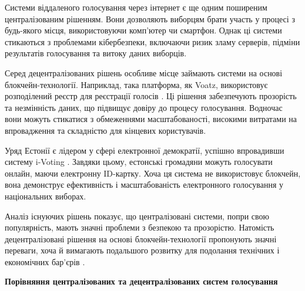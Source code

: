\documentclass[14pt]{extreport}
\begin{document}
  Системи віддаленого голосування через інтернет є ще одним поширеним централізованим рішенням. Вони дозволяють виборцям брати участь у процесі з будь-якого місця, використовуючи комп’ютер чи смартфон. Однак ці системи стикаються з проблемами кібербезпеки, включаючи ризик зламу серверів, підміни результатів голосування та витоку даних виборців.

  Серед децентралізованих рішень особливе місце займають системи на основі блокчейн-технології. Наприклад, така платформа, як Voatz, використовує розподілений реєстр для реєстрації голосів \cite{voatz}. Ці рішення забезпечують прозорість та незмінність даних, що підвищує довіру до процесу голосування. Водночас вони можуть стикатися з обмеженнями масштабованості, високими витратами на впровадження та складністю для кінцевих користувачів.

  Уряд Естонії є лідером у сфері електронної демократії, успішно впровадивши систему i-Voting \cite{ivoting}. Завдяки цьому, естонські громадяни можуть голосувати онлайн, маючи електронну ID-картку. Хоча ця система не використовує блокчейн, вона демонструє ефективність і масштабованість електронного голосування у національних виборах.

  Аналіз існуючих рішень показує, що централізовані системи, попри свою популярність, мають значні проблеми з безпекою та прозорістю. Натомість децентралізовані рішення на основі блокчейн-технології пропонують значні переваги, хоча й вимагають подальшого розвитку для подолання технічних і економічних бар'єрів \cite{ieee:almeida}.
  
  \begin{table}[H]
  \centering
  \renewcommand{\tablename}{Таблиця}
  \renewcommand{\thetable}{\thechapter.\arabic{table}.}
  \captionsetup{justification=raggedleft, singlelinecheck=false, labelsep=period}
  \caption{}
  \textbf{Порівняння централізованих та децентралізованих систем голосування\vspace{5pt}}
  \label{tab:voting_systems_comparison_compact}
  \end{table}
  
\end{document}

